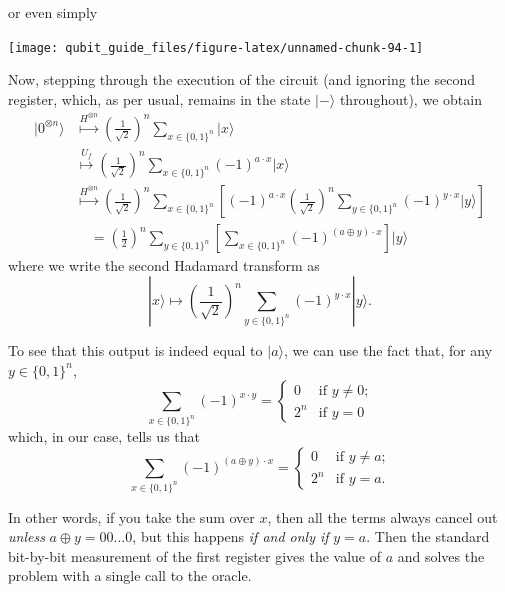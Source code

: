\documentclass[fleqn,a4paper]{article}
\renewcommand{\footnote}[1]{\sidenotetext[{\color{white}0}\!\!]{\footnotesize #1}}
\theoremstyle{definition}
\theoremstyle{definition}
\theoremstyle{definition}
\theoremstyle{definition}
\theoremstyle{remark}
\begin{document}
or even simply

\begin{center}\texttt{[image: qubit\_guide\_files/figure-latex/unnamed-chunk-94-1]} \end{center}

Now, stepping through the execution of the circuit (and ignoring the second register, which, as per usual, remains in the state \(|-\rangle\) throughout), we obtain
\[
  \begin{aligned}
    |0^{\otimes n}\rangle
    &\overset{H^{\otimes n}}{\longmapsto}
    \left(\frac{1}{\sqrt{2}}\right)^n \sum_{x\in\{0,1\}^n} |x\rangle
  \\&\overset{U_f}{\longmapsto}
    \left(\frac{1}{\sqrt{2}}\right)^n \sum_{x\in\{0,1\}^n} (-1)^{a\cdot x}|x\rangle
  \\&\overset{H^{\otimes n}}{\longmapsto}
    \left(\frac{1}{\sqrt{2}}\right)^n \sum_{x\in\{0,1\}^n}
    \left[
      (-1)^{a\cdot x} \left(\frac{1}{\sqrt{2}}\right)^n
      \sum_{y\in\{0,1\}^n} (-1)^{y\cdot x} |y\rangle
    \right]
  \\&\quad= \left(\frac{1}{2}\right)^n \sum_{y\in\{0,1\}^n}
    \left[
      \sum_{x\in\{0,1\}^n} (-1)^{(a\oplus y)\cdot x}
    \right]
    |y\rangle
  \end{aligned}
\]
where we write the second Hadamard transform as
\[
  |x\rangle
  \longmapsto
  \left(\frac{1}{\sqrt{2}}\right)^n \sum_{y\in\{0,1\}^n} (-1)^{y\cdot x}|y\rangle.
\]

To see that this output is indeed equal to \(|a\rangle\), we can use the fact\footnote{Exercise \ref{picking-out-a-single-state}.} that, for any \(y\in\{0,1\}^n\),
\[
  \sum_{x\in\{0,1\}^n} (-1)^{x\cdot y}
  = \begin{cases}
    0 &\text{if $y\neq0$;}
  \\2^n &\text{if $y=0$}
  \end{cases}
\]
which, in our case, tells us that
\[
  \sum_{x\in\{0,1\}^n} (-1)^{(a\oplus y)\cdot x}
  = \begin{cases}
    0 &\text{if $y\neq a$;}
  \\2^n &\text{if $y=a$.}
  \end{cases}
\]

In other words, if you take the sum over \(x\), then all the terms always cancel out \emph{unless} \(a\oplus y = 00\ldots0\), but this happens \emph{if and only if} \(y=a\).
Then the standard bit-by-bit measurement of the first register gives the value of \(a\) and solves the problem with a single call to the oracle.
\end{document}
